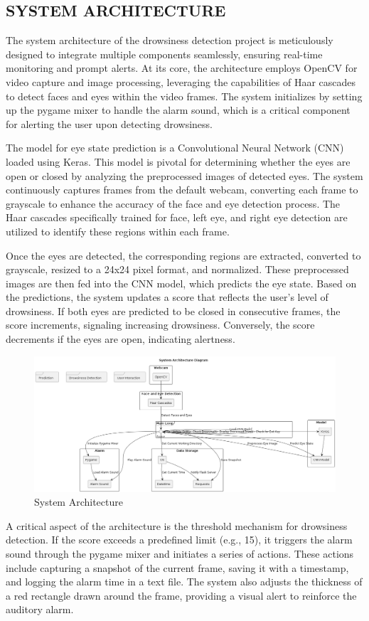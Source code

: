 \documentclass[12pt]{article}
\begin{document}
\subsection{SYSTEM ARCHITECTURE }
The system architecture of the drowsiness detection project is meticulously designed to integrate multiple components seamlessly, ensuring real-time monitoring and prompt alerts. At its core, the architecture employs OpenCV for video capture and image processing, leveraging the capabilities of Haar cascades to detect faces and eyes within the video frames. The system initializes by setting up the pygame mixer to handle the alarm sound, which is a critical component for alerting the user upon detecting drowsiness.

The model for eye state prediction is a Convolutional Neural Network (CNN) loaded using Keras. This model is pivotal for determining whether the eyes are open or closed by analyzing the preprocessed images of detected eyes. The system continuously captures frames from the default webcam, converting each frame to grayscale to enhance the accuracy of the face and eye detection process. The Haar cascades specifically trained for face, left eye, and right eye detection are utilized to identify these regions within each frame.

Once the eyes are detected, the corresponding regions are extracted, converted to grayscale, resized to a 24x24 pixel format, and normalized. These preprocessed images are then fed into the CNN model, which predicts the eye state. Based on the predictions, the system updates a score that reflects the user's level of drowsiness. If both eyes are predicted to be closed in consecutive frames, the score increments, signaling increasing drowsiness. Conversely, the score decrements if the eyes are open, indicating alertness.
\begin{figure}[h]
\centering
\includegraphics[width=1.0\textwidth]{sysarchi}
\caption{System Architecture}
\end{figure}
\FloatBarrier
A critical aspect of the architecture is the threshold mechanism for drowsiness detection. If the score exceeds a predefined limit (e.g., 15), it triggers the alarm sound through the pygame mixer and initiates a series of actions. These actions include capturing a snapshot of the current frame, saving it with a timestamp, and logging the alarm time in a text file. The system also adjusts the thickness of a red rectangle drawn around the frame, providing a visual alert to reinforce the auditory alarm.
\end{document}
